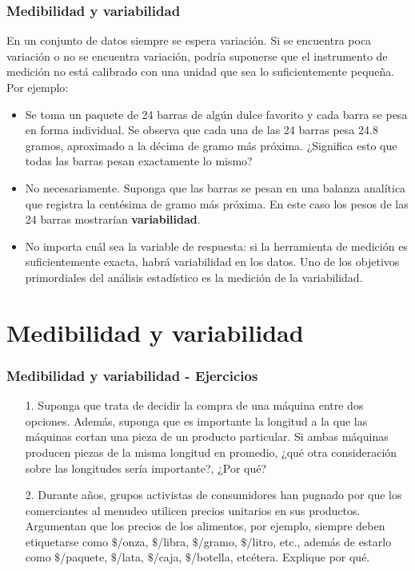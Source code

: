 \documentclass[10pt]{beamer}
\theoremstyle{plain} %
\theoremstyle{definition}
\theoremstyle{remark}
\begin{document}
\begin{frame}
\frametitle{Medibilidad y variabilidad}
En un conjunto de datos siempre se espera variación. Si se encuentra poca variación o no se encuentra variación, podría suponerse que el instrumento de medición no está calibrado con una unidad que sea lo suficientemente pequeña.\\

Por ejemplo:\\
\begin{itemize}[<+->]
\justifying
\item Se toma un paquete de 24 barras de algún dulce favorito y cada barra se pesa en forma individual. Se observa que cada una de las 24 barras pesa 24.8 gramos, aproximado a la décima de gramo más próxima. ¿Significa esto que todas las barras pesan exactamente lo mismo?

\item No necesariamente. Suponga que las barras se pesan en una balanza analítica que registra la centésima de gramo más próxima. En este caso los pesos de las 24 barras mostrarían \textbf{variabilidad}.

\item No importa cuál sea la variable de respuesta: si la herramienta de medición es suficientemente exacta, habrá variabilidad en los datos. Uno de los objetivos primordiales del análisis estadístico es la medición de la variabilidad.

\end{itemize} 
\end{frame}

\section{Medibilidad y variabilidad}
\begin{frame}
\frametitle{Medibilidad y variabilidad - Ejercicios}
\begin{itemize}
\justifying
\item[1.]Suponga que trata de decidir la compra de una máquina entre dos opciones. Además, suponga que es importante la longitud a la que las máquinas cortan una pieza de un producto particular. Si ambas máquinas producen piezas de la misma longitud en promedio, ¿qué otra consideración sobre las longitudes sería importante?, ¿Por qué?

\item[2.]Durante años, grupos activistas de consumidores han pugnado por que los comerciantes al menudeo utilicen precios unitarios en sus productos. Argumentan que los precios de los alimentos, por ejemplo, siempre deben etiquetarse como $\$$/onza, $\$$/libra, $\$$/gramo, $\$$/litro, etc., además de estarlo como $\$$/paquete, $\$$/lata, $\$$/caja, $\$$/botella, etcétera. Explique por qué.


\end{itemize} 
\end{frame}
\end{document}
